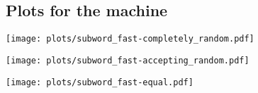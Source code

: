 \subsection{Plots for the  machine}
\label{plots_subword_fast}
\begin{center}\texttt{[image: plots/subword\_fast-completely\_random.pdf]}\end{center}
\begin{center}\texttt{[image: plots/subword\_fast-accepting\_random.pdf]}\end{center}
\begin{center}\texttt{[image: plots/subword\_fast-equal.pdf]}\end{center}
